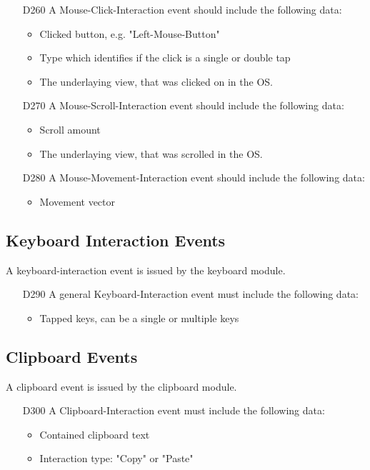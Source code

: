 \begin{itemize}
\item[D260] A Mouse-Click-Interaction event should include the following data:
	\begin{itemize}
	\item Clicked button, e.g. "Left-Mouse-Button"
	\item Type which identifies if the click is a single or double tap
	\item The underlaying view, that was clicked on in the OS. 
	\end{itemize}

\item[D270] A Mouse-Scroll-Interaction event should include the following data:
	\begin{itemize}
	\item Scroll amount
	\item The underlaying view, that was scrolled in the OS.
	\end{itemize}

\item[D280] A Mouse-Movement-Interaction event should include the following data:
	\begin{itemize}
	\item Movement vector
	\end{itemize}
\end{itemize}

\subsection{Keyboard Interaction Events}

A keyboard-interaction event is issued by the keyboard module.

\begin{itemize}
\item[D290] A general Keyboard-Interaction event must include the following data:
	\begin{itemize}
	\item Tapped keys, can be a single or multiple keys
	\end{itemize}
\end{itemize}

\subsection{Clipboard Events}

A clipboard event is issued by the clipboard module.

\begin{itemize}
\item[D300] A Clipboard-Interaction event must include the following data:
	\begin{itemize}
	\item Contained clipboard text
	\item Interaction type: "Copy" or "Paste"
	\end{itemize}
\end{itemize}

